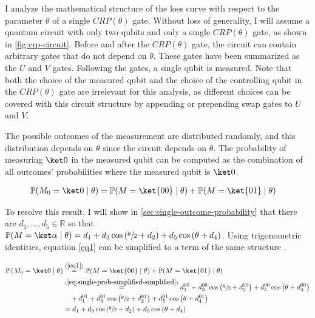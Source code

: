 I analyze the mathematical structure of the loss curve with respect to the
parameter $\theta$ of a single $CRP(\theta)$ gate.
Without loss of generality, I will assume a quantum circuit with only two
qubits and only a single $CRP(\theta)$ gate, as shown in
\autoref{fig:crp-circuit}.
Before and after the $CRP(\theta)$ gate, the circuit can contain arbitrary gates
that do not depend on $\theta$.
These gates have been summarized as the $U$ and $V$ gates.
Following the gates, a single qubit is measured.
Note that both the choice of the measured qubit and the choice of the
controlling qubit in the $CRP(\theta)$ gate are irrelevant for this analysis, as
different choices can be covered with this circuit structure by appending or
prepending swap gates to $U$ and $V$.

The possible outcomes of the measurement are distributed randomly, and this
distribution depends on $\theta$ since the circuit depends on $\theta$.
The probability of measuring $\ket 0$ in the measured qubit can be computed as
the combination of all outcomes' probabilities where the measured qubit is
$\ket 0$.

\begin{equation}
    \label{eq1}
    \begin{split}
        \mathbb{P}(M_0 = \ket 0 \mid \theta)
            &= \mathbb{P}(M = \ket{00} \mid \theta) + \mathbb{P}(M = \ket{01} \mid \theta)
    \end{split}
\end{equation}

To resolve this result, I will show in \autoref{sec:single-outcome-probability}
that there are $d_1, \dots, d_5 \in \mathbb R$ so that
$\mathbb P(M = \ket\alpha \mid \theta) = d_1 + d_3 \cos\left(\sfrac\theta2 + d_2\right) + d_5 \cos\left(\theta + d_4\right)$.
Using trigonometric identities, equation \ref{eq1} can be simplified to a term
of the same structure \cite{bronstejn_taschenbuch_2016}.

\begin{equation}
    \label{eq:total-result-probability}
    \begin{split}
        \mathbb P\left(M_0 = \ket 0 \mid \theta\right)
            &\stackrel{(\ref{eq1})}=
                \mathbb{P}(M = \ket{00} \mid \theta) + \mathbb{P}(M = \ket{01} \mid \theta) \\
            &\stackrel{(\ref{eq:single-prob-simplified-simplified})}=
                d_1^{00} + d_3^{00} \cos\left(\sfrac\theta2 + d_2^{00}\right) + d_5^{00} \cos\left(\theta + d_4^{00}\right) \\
                &\quad + d_1^{01} + d_3^{01} \cos\left(\sfrac\theta2 + d_2^{01}\right) + d_5^{01} \cos\left(\theta + d_4^{01}\right) \\
            &= d_1 + d_3 \cos\left(\sfrac\theta2 + d_2\right) + d_5 \cos\left(\theta + d_4\right)
    \end{split}
\end{equation}

